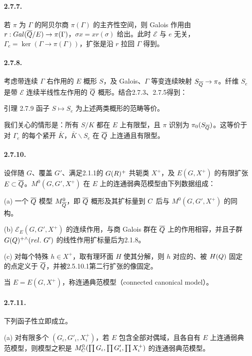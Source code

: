 \paragraph*{2.7.7.} 若 $\pi$ 为 $\Gamma$ 的阿贝尔商 $\pi(\Gamma)$ 的主齐性空间，则 Galois 作用由 $r:Gal(\overline{Q}/E)\to\pi(\Gamma)$，$\sigma x=xr(\sigma)$ 给出。此时 $\mathcal E$ 与 $e$ 无关，$\Gamma_e=\ker(\Gamma\to\pi(\Gamma))$，扩张是沿 $r$ 拉回 $\Gamma$ 得到。
\paragraph*{2.7.8.} 考虑带连续 $\Gamma$ 右作用的 $E$ 概形 $S$，及 Galois、$\Gamma$ 等变连续映射 $S_{\overline{Q}}\to\pi$。纤维 $S_e$ 是带 $\mathcal E$ 连续半线性左作用的 $\overline{Q}$ 概形。结合2.7.3、2.7.5得到：
\begin{originaltheorem}{引理 2.7.9}
函子 $S\mapsto S_e$ 为上述两类概形的范畴等价。
\end{originaltheorem}
我们关心的情形是：所有 $S/K$ 都在 $E$ 上有限型，且 $\pi$ 识别为 $\pi_0(S_{\overline{Q}})$。这等价于对 $\Gamma_e$ 的每个紧开 $\bar K$，$\bar K\backslash S_e$ 在 $\overline{Q}$ 上连通且有限型。
\paragraph*{2.7.10.} 设伴随 $G$、覆盖 $G'$、满足2.1.1的 $G(R)^+$ 共轭类 $X^+$，及 $E(G,X^+)$ 的有限扩张 $E\subset\overline{Q}$。$M^0(G,G',X^+)$ 在 $E$ 上的连通弱典范模型由下列数据组成：

(a) 一个 $\overline{Q}$ 模型 $M_{\overline{Q}}^0$，即 $\overline{Q}$ 概形及其扩标量到 $C$ 后与 $M^0(G,G',X^+)$ 的同构。

(b) $\mathcal E_E(G,G',X^+)$ 的连续作用，与商 Galois 群在 $\overline{Q}$ 上的作用相容，并且子群 $G(Q)^{+\wedge}(rel.\ G')$ 的线性作用扩标量后为2.1.8。

(c) 对每个特殊 $h\in X^+$，取有理环面 $H$ 使其分解，则 $h$ 对应的、被 $H(Q)$ 固定的点定义于 $\overline{Q}$，并被2.5.10.1第二行扩张的像固定。

当 $E=E(G,X^+)$，称连通典范模型（connected canonical model）。
\paragraph*{2.7.11.} 下列函子性立即成立。

(a) 对有限多个 $(G_\iota,G'_\iota,X_\iota^+)$，若 $E$ 包含全部对偶域，且各自有 $E$ 上连通弱典范模型，则模型之积是 $M_{C}^0(\prod G_\iota,\prod G'_\iota,\prod X_\iota^+)$ 的连通弱典范模型。

